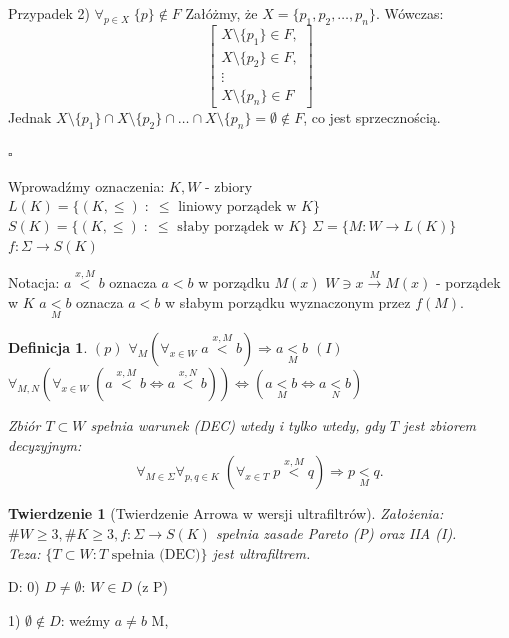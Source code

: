 \documentclass[12pt,a4paper]{article}
\theoremstyle{break}
\newtheorem{definition}{Definicja}[section]
\newtheorem{theorem}{Twierdzenie}[section]
\begin{document}
	Przypadek 2) $\forall_{p \in X} \; \{p\} \notin F$  
	Załóżmy, że $X = \{p_1, p_2, \dots, p_n\}$.  
	Wówczas:
	\[
	\begin{bmatrix}
		X \setminus \{p_1\} \in F,\\
		X \setminus \{p_2\} \in F,\\
		\vdots\\
		X \setminus \{p_n\} \in F
	\end{bmatrix}
	\]
	Jednak $X \setminus \{p_1\} \cap X \setminus \{p_2\} \cap \dots \cap X \setminus \{p_n\} = \emptyset \notin F$, co jest sprzecznością.  
	
	\begin{flushright}$\square$\end{flushright}
	
	Wprowadźmy oznaczenia:  
	$K, W$ - zbiory  
	$L(K) = \{ (K, \leq) \; : \; \leq \text{ liniowy porządek w } K \}$  
	$S(K) = \{ (K, \leq) \; : \; \leq \text{ słaby porządek w } K \}$  
	$\Sigma = \{ M : W \to L(K) \}$  
	$f : \Sigma \to S(K)$  
	
	Notacja:  
	$a \overset{x, M}{<} b$ oznacza $a < b$ w porządku $M(x)$  
	$W \ni x \overset{M}{\to} M(x)$ - porządek w $K$  
	$a \underset{M}{<} b$ oznacza $a < b$ w słabym porządku wyznaczonym przez $f(M)$.
	
	\begin{definition}
		$(p)$ $\forall_M (\forall_{x \in W} \; a \overset{x, M}{<} b) \Rightarrow a \underset{M}{<} b$  
		$(I)$ $\forall_{M, N} (\forall_{x \in W} \; (a \overset{x, M}{<} b \iff a \overset{x, N}{<} b)) \iff (a \underset{M}{<} b \iff a \underset{N}{<} b)$  
		
		Zbiór $T \subset W$ spełnia warunek (DEC) wtedy i tylko wtedy, gdy $T$ jest zbiorem decyzyjnym:  
		\[
		\forall_{M \in \Sigma} \forall_{p, q \in K} \; (\forall_{x \in T} \; p \overset{x, M}{<} q) \Rightarrow p \underset{M}{<} q.
		\]
	\end{definition}
	
	\begin{theorem}[Twierdzenie Arrowa w wersji ultrafiltrów]
		Założenia: $\# W \geq 3, \# K \geq 3, f : \Sigma \to S(K)$ spełnia zasade Pareto (P) oraz IIA (I).  \\
		Teza: $\{T \subset W : T \text{ spełnia (DEC)}\}$ jest ultrafiltrem.
	\end{theorem}
	
	D: 0) $D\neq \emptyset$: $W\in D$ (z P)
	
	1) $\emptyset \notin D$: weźmy $a\neq b$ M, 
	
\end{document}
